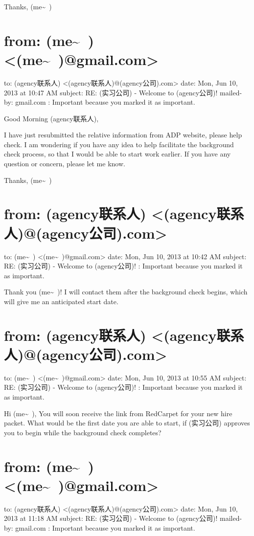 \documentclass[12pt]{book}
\begin{document}
Thanks,
(me\textasciitilde{}~)


\section{from:         (me\textasciitilde{}~) <(me\textasciitilde{}~)@gmail.com>}
\label{sec-39-13}
to:         (agency联系人) <(agency联系人)@(agency公司).com>
date:         Mon, Jun 10, 2013 at 10:47 AM
subject:         RE: (实习公司) - Welcome to (agency公司)!
mailed-by:         gmail.com
:         Important because you marked it as important.

Good Morning (agency联系人),

I have just resubmitted the relative information from ADP website, please help check.
I am wondering if you have any idea to help facilitate the background check process, so that I would be able to start work earlier.
If you have any question or concern, please let me know.

Thanks,
(me\textasciitilde{}~)


\section{from:         (agency联系人) <(agency联系人)@(agency公司).com>}
\label{sec-39-14}
to:         (me\textasciitilde{}~) <(me\textasciitilde{}~)@gmail.com>
date:         Mon, Jun 10, 2013 at 10:42 AM
subject:         RE: (实习公司) - Welcome to (agency公司)!
:         Important because you marked it as important.

Thank you (me\textasciitilde{}~)!
I will contact them after the background check begins, which will give me an anticipated start date.


\section{from:         (agency联系人) <(agency联系人)@(agency公司).com>}
\label{sec-39-15}
to:         (me\textasciitilde{}~) <(me\textasciitilde{}~)@gmail.com>
date:         Mon, Jun 10, 2013 at 10:55 AM
subject:         RE: (实习公司) - Welcome to (agency公司)!
:         Important because you marked it as important.

Hi (me\textasciitilde{}~),
You will soon receive the link from RedCarpet for your new hire packet. What would be the first date you are able to start, if (实习公司) approves you to begin while the background check completes?


\section{from:         (me\textasciitilde{}~) <(me\textasciitilde{}~)@gmail.com>}
\label{sec-39-16}
to:         (agency联系人) <(agency联系人)@(agency公司).com>
date:         Mon, Jun 10, 2013 at 11:18 AM
subject:         RE: (实习公司) - Welcome to (agency公司)!
mailed-by:         gmail.com
:         Important because you marked it as important.
\end{document}
